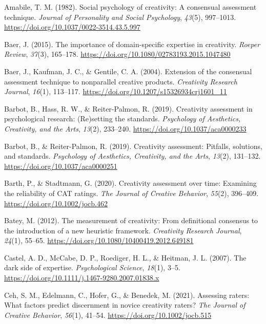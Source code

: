 \documentclass[
  12pt,
]{article}
\newlength{\cslhangindent}
\newenvironment{CSLReferences}[2] %
 {\begin{list}{}{%
  \setlength{\itemindent}{0pt}
  \setlength{\leftmargin}{0pt}
  \setlength{\parsep}{0pt}
  \ifodd #1
   \setlength{\leftmargin}{\cslhangindent}
   \setlength{\itemindent}{-1\cslhangindent}
  \fi
  \setlength{\itemsep}{#2\baselineskip}}}
 {\end{list}}
\begin{document}
\label{refs}
\begin{CSLReferences}{1}{0}
Amabile, T. M. (1982). Social psychology of creativity: A consensual
assessment technique. \emph{Journal of Personality and Social
Psychology}, \emph{43}(5), 997--1013.
\url{https://doi.org/10.1037/0022-3514.43.5.997}

Baer, J. (2015). The importance of domain-specific expertise in
creativity. \emph{Roeper Review}, \emph{37}(3), 165--178.
\url{https://doi.org/10.1080/02783193.2015.1047480}

Baer, J., Kaufman, J. C., \& Gentile, C. A. (2004). Extension of the
consensual assessment technique to nonparallel creative products.
\emph{Creativity Research Journal}, \emph{16}(1), 113--117.
\url{https://doi.org/10.1207/s15326934crj1601_11}

Barbot, B., Hass, R. W., \& Reiter-Palmon, R. (2019). Creativity
assessment in psychological research: (Re)setting the standards.
\emph{Psychology of Aesthetics, Creativity, and the Arts}, \emph{13}(2),
233--240. \url{https://doi.org/10.1037/aca0000233}

Barbot, B., \& Reiter-Palmon, R. (2019). Creativity assessment:
Pitfalls, solutions, and standards. \emph{Psychology of Aesthetics,
Creativity, and the Arts}, \emph{13}(2), 131--132.
\url{https://doi.org/10.1037/aca0000251}

Barth, P., \& Stadtmann, G. (2020). Creativity assessment over time:
Examining the reliability of {CAT} ratings. \emph{The Journal of
Creative Behavior}, \emph{55}(2), 396--409.
\url{https://doi.org/10.1002/jocb.462}

Batey, M. (2012). The measurement of creativity: From definitional
consensus to the introduction of a new heuristic framework.
\emph{Creativity Research Journal}, \emph{24}(1), 55--65.
\url{https://doi.org/10.1080/10400419.2012.649181}

Castel, A. D., McCabe, D. P., Roediger, H. L., \& Heitman, J. L. (2007).
The dark side of expertise. \emph{Psychological Science}, \emph{18}(1),
3--5. \url{https://doi.org/10.1111/j.1467-9280.2007.01838.x}

Ceh, S. M., Edelmann, C., Hofer, G., \& Benedek, M. (2021). Assessing
raters: What factors predict discernment in novice creativity raters?
\emph{The Journal of Creative Behavior}, \emph{56}(1), 41--54.
\url{https://doi.org/10.1002/jocb.515}


\end{CSLReferences}
\end{document}
